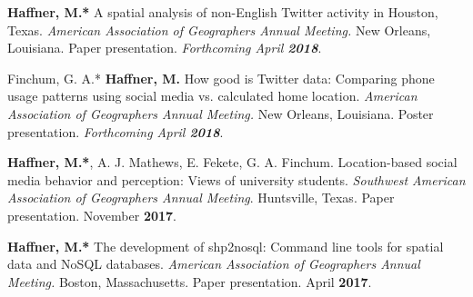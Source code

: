 \begin{cventries}
   \cventry
      {}
      {}
      {}
      {}
      {
        \begin{cvitems}
          \vspace{-2mm}
        \item {\textbf{Haffner, M.*} A spatial analysis of non-English Twitter
            activity in Houston, Texas.
             \textit{American Association of Geographers Annual Meeting.} New Orleans, Louisiana.
            Paper presentation. \textit{Forthcoming April \textbf{2018}}.}
          \end{cvitems}
        } %

   \cventry
      {}
      {}
      {}
      {}
      {
        \begin{cvitems}
          \vspace{-2mm}
        \item {Finchum, G. A.* \textbf{Haffner, M.} How good is Twitter data:
            Comparing phone usage patterns using social media vs. calculated
            home location.
             \textit{American Association of Geographers Annual Meeting.} New Orleans, Louisiana.
            Poster presentation. \textit{Forthcoming April \textbf{2018}}.}
          \end{cvitems}
        } %

   \cventry
      {}
      {}
      {}
      {}
      {
        \begin{cvitems}
          \vspace{-2mm}
        \item {\textbf{Haffner, M.*}, A. J. Mathews, E. Fekete, G. A. Finchum.
            Location-based social media behavior and perception: Views of
            university students. \textit{Southwest American Association of
              Geographers Annual Meeting}. Huntsville, Texas. Paper
            presentation. November \textbf{2017}.}
          \end{cvitems}
        } %

   \cventry
      {}
      {}
      {}
      {}
      {
        \begin{cvitems}
          \vspace{-2mm}
        \item {\textbf{Haffner, M.*} The development of shp2nosql: Command line
            tools for spatial data and NoSQL databases. \textit{American
            Association of Geographers Annual Meeting.} Boston, Massachusetts.
            Paper presentation. April \textbf{2017}.}
          \end{cvitems}
        } %


\end{cventries}
